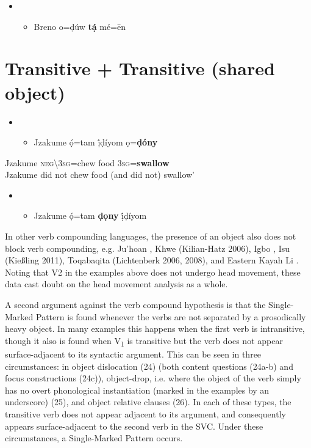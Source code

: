 \documentclass[output=paper]{langsci/langscibook}
\begin{document}
\begin{itemize}
\item \setcounter{itemize}{0}
\begin{itemize}
\item \gll *Breno o=ḍúw  \textbf{tạ́}  mé=\={e}n\\
\end{itemize}
\end{itemize}
\chapter[Transitive + Transitive (shared object)]{Transitive + Transitive (shared object)}
\label{bkm:Ref419990314}\begin{itemize}
\item \setcounter{itemize}{0}
\begin{itemize}
\item \gll Jzakume   ọ́=tam      ị́ḍíyom  ọ=\textbf{ḍóny}\\
\end{itemize}
\end{itemize}
     Jzakume  \textsc{neg{\textbackslash}}3\textsc{sg}=chew  food  3\textsc{sg}=\textbf{swallow}\\
\glt Jzakume did not chew food (and did not) swallow’ \citep[110]{Kari2004}
\z

\begin{itemize}
\item \setcounter{itemize}{0}
\begin{itemize}
\item \gll *Jzakume  ọ́=tam  \textbf{ḍọny  }ị́ḍíyom\\
\end{itemize}
\end{itemize}

In other verb compounding languages, the presence of an object also does not block verb compounding, e.g. Ju{\textbar}’hoan \citep{Collins2002}, Khwe (Kilian-Hatz 2006), Igbo \citep{Lord1975}, Isu (Kießling 2011), Toqabaqita (Lichtenberk 2006, 2008), and Eastern Kayah Li \citep{Solnit2006}. Noting that V2 in the examples above does not undergo head movement, these data cast doubt on the head movement analysis as a whole.

A second argument against the verb compound hypothesis is that the Single-Marked Pattern is found whenever the verbs are not separated by a prosodically heavy object. In many examples this happens when the first verb is intransitive, though it also is found when V\textsubscript{1} is transitive but the verb does not appear surface-adjacent to its syntactic argument. This can be seen in three circumstances: in object dislocation (24) (both content questions (24a-b) and focus constructions (24c)), object-drop, i.e. where the object of the verb simply has no overt phonological instantiation (marked in the examples by an underscore) (25), and object relative clauses (26). In each of these types, the transitive verb does not appear adjacent to its argument, and consequently appears surface-adjacent to the second verb in the SVC. Under these circumstances, a Single-Marked Pattern occurs.
\end{document}
